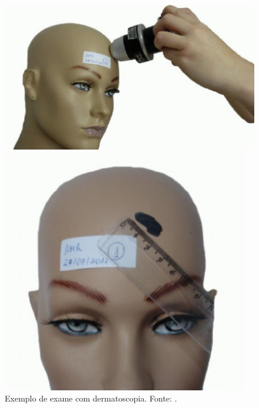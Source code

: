 \begin{figure}[ht]
      \centering
      \begin{minipage}{0.32\textwidth}
            \centering
            \includegraphics[height=0.8\columnwidth,keepaspectratio]{images/contact.png}
            \caption{\small Exemplo de exame com dermatoscopia. Fonte: \textcite{fotos_dermatologia}.}
            \label{fig:contact_pic}
      \end{minipage}\hfill
      \begin{minipage}{0.32\textwidth}
            \centering
            \includegraphics[height=0.8\columnwidth,keepaspectratio]{images/approximation.png}

\end{minipage}
\end{figure}
